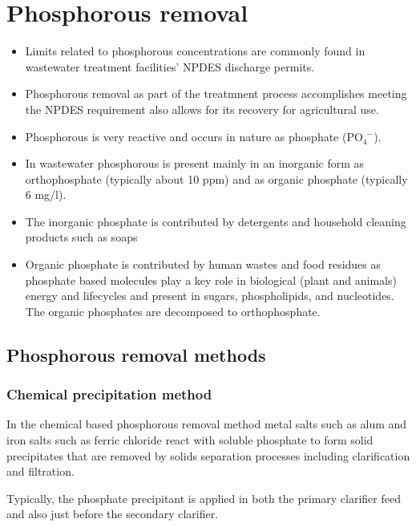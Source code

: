 \section{Phosphorous removal}
		\begin{itemize}
		\item Limits related to phosphorous concentrations are commonly found in wastewater treatment facilities' NPDES discharge permits.
		\item Phosphorous removal as part of the treatmnent process accomplishes meeting the NPDES requirement also allows for its recovery for agricultural use.
			\item Phosphorous is very reactive and occurs in nature as phosphate (PO$_4^{\enspace -}$).  
			\item In wastewater phosphorous is present mainly in an inorganic form as orthophosphate (typically about 10 ppm) and as organic phosphate (typically 6 mg/l).
			\item The inorganic phosphate is contributed by detergents and household cleaning products such as soaps
			\item Organic phosphate is contributed by human wastes and food residues as phosphate based molecules play a key role in biological (plant and animals) energy and lifecycles and present in sugars, phospholipids, and nucleotides.  The organic phosphates are decomposed to orthophosphate.
		\end{itemize}
	\vspace{0.3cm}
\subsection{Phosphorous removal methods}

\subsubsection{Chemical precipitation method}

			In the chemical based phosphorous removal method metal salts such as alum and iron salts such as ferric chloride react with soluble phosphate to form solid precipitates that are removed by solids separation processes including clarification and filtration. 
			
			Typically, the phosphate precipitant is applied in both the primary clarifier feed and also just before the secondary clarifier.


